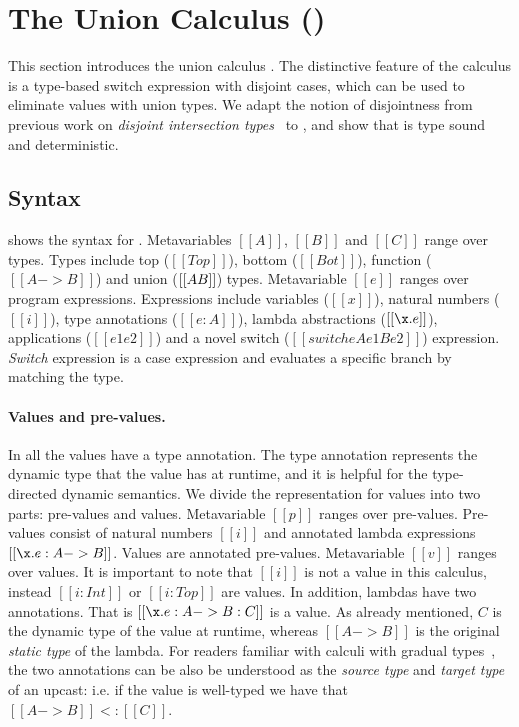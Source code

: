 \section{The Union Calculus (\name)}
\label{sec:union}

This section introduces the union calculus \name. The distinctive feature
of the \name calculus is a type-based switch expression with disjoint
cases, which can be used to eliminate values with union types.
We adapt the notion of disjointness from previous work on
\emph{disjoint intersection types}~\cite{oliveira2016disjoint} to \name, and show that \name is type
sound and deterministic.


\subsection{Syntax}\label{sec:union:syntax}
 shows the syntax for \cal. Metavariables
$[[A]]$, $[[B]]$ and $[[C]]$ range over types.  Types include top ($[[Top]]$),
bottom ($[[Bot]]$), function ($[[A -> B]]$) and union ($[[A \/ B]]$)
types. Metavariable $[[e]]$ ranges over program
expressions. Expressions include variables ($[[x]]$), natural numbers
($[[i]]$), type annotations ($[[e:A]]$), lambda abstractions
($[[\x.e]]$), applications ($[[e1 e2]]$) and a novel switch ($[[switch
    e A e1 B e2]]$) expression. \emph{Switch} expression is a case
expression and evaluates a specific branch by matching the
type.

\paragraph{Values and pre-values.} In \name all the values have
a type annotation. The type annotation represents the dynamic type
that the value has at runtime, and
it is helpful for the type-directed dynamic semantics.
We divide the representation for values into two parts: pre-values and
values.
Metavariable $[[p]]$ ranges over pre-values. Pre-values
consist of natural numbers $[[i]]$
and annotated lambda expressions $[[\x.e : A -> B]]$. Values are
annotated pre-values. Metavariable $[[v]]$ ranges over
values. It is important to note that $[[i]]$ is not a value in this
calculus, instead $[[i:Int]]$ or $[[i:Top]]$ are values.
In addition, lambdas have two annotations. That is $[[\x.e : A -> B : C]]$ is a value.
As already mentioned, $C$ is the dynamic type of the value
at runtime, whereas $[[A -> B]]$ is the original \emph{static type} of the lambda.
For readers familiar with calculi with gradual types~\cite{}, the two annotations
can be also be understood as the \emph{source type} and \emph{target type}
of an upcast: i.e. if the value is well-typed we have that $[[A -> B]] <: [[C]]$.

